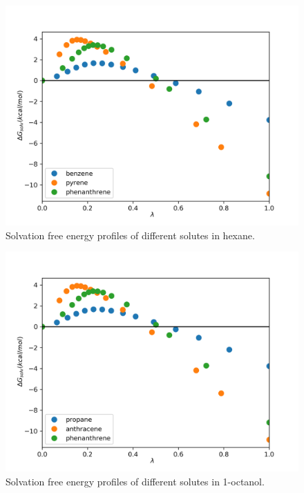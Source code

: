 \begin{figure}[H]
\centering
\includegraphics[width=0.9\linewidth]{Figures/hex}
\caption{Solvation free energy profiles of different solutes in hexane.}
\label{fig:hex}
\end{figure}

\begin{figure}[H]
	\centering
	\includegraphics[width=0.9\linewidth]{Figures/oct}
	\caption{Solvation free energy profiles of different solutes in 1-octanol.}
	\label{fig:oct}
\end{figure}


